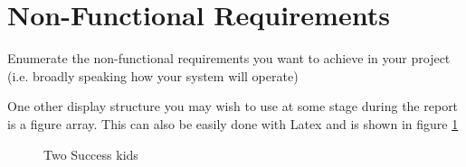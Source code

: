 \section{Non-Functional Requirements}
Enumerate the non-functional requirements you want to achieve in your project (i.e. broadly speaking how your system will operate)

One other display structure you may wish to use at some stage during the report is a figure array. This can also be easily done with Latex and is shown in figure \ref{fig:twosuccesskid}

\begin{figure}
\centering     %
{}
\caption{Two Success kids}
\label{fig:twosuccesskid}
\end{figure}